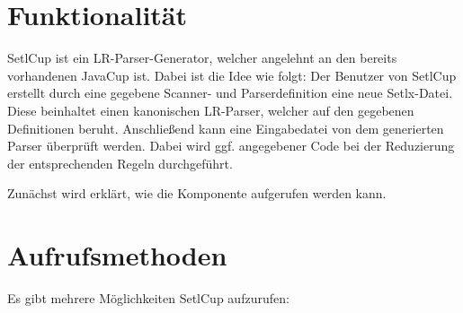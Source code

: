 \chapter{Funktionalität}
SetlCup ist ein LR-Parser-Generator, welcher angelehnt an den bereits vorhandenen JavaCup ist.
Dabei ist die Idee wie folgt:
Der Benutzer von SetlCup erstellt durch eine gegebene Scanner- und Parserdefinition eine neue Setlx-Datei. Diese beinhaltet einen kanonischen LR-Parser, welcher auf den gegebenen Definitionen beruht. Anschließend kann eine Eingabedatei von dem generierten Parser überprüft werden. Dabei wird ggf. angegebener Code bei der Reduzierung der entsprechenden Regeln durchgeführt. 

Zunächst wird erklärt, wie die Komponente aufgerufen werden kann.
\chapter{Aufrufsmethoden}
Es gibt mehrere Möglichkeiten SetlCup aufzurufen:
